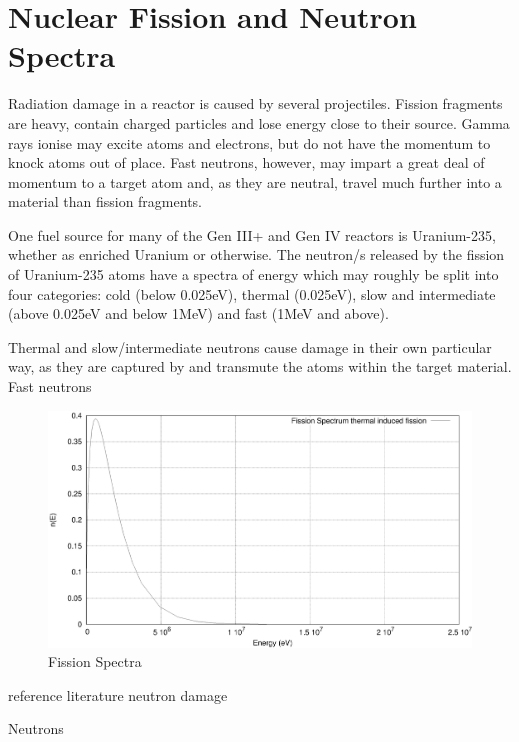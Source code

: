 \section{Nuclear Fission and Neutron Spectra}

Radiation damage in a reactor is caused by several projectiles.  Fission fragments are heavy, contain charged particles and lose energy close to their source.  Gamma rays ionise may excite atoms and electrons, but do not have the momentum to knock atoms out of place.  Fast neutrons, however, may impart a great deal of momentum to a target atom and, as they are neutral, travel much further into a material than fission fragments.

One fuel source for many of the Gen III+ and Gen IV reactors is Uranium-235, whether as enriched Uranium or otherwise.  The neutron/s released by the fission of Uranium-235 atoms have a spectra of energy which may roughly be split into four categories: cold (below 0.025eV), thermal (0.025eV), slow and intermediate (above 0.025eV and below 1MeV) and fast (1MeV and above).

Thermal and slow/intermediate neutrons cause damage in their own particular way, as they are captured by and transmute the atoms within the target material.  Fast neutrons 


\begin{figure}[tbp]
  \begin{center}
    \includegraphics[width=15.0cm]{chapters/introduction/plots/fission_spectra/fission_spectra.eps}
    \caption{Fission Spectra}
    \label{fig:electricityusagesuk}
  \end{center}
\end{figure}





reference literature neutron damage

Neutrons 





